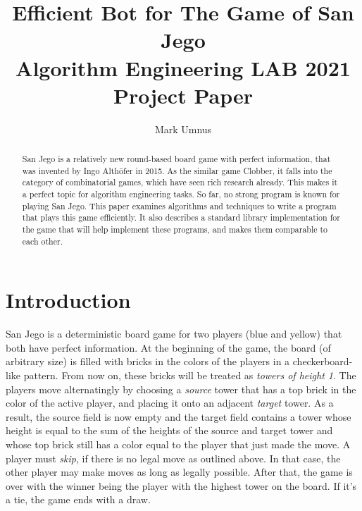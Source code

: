 \documentclass[sigconf]{acmart}
\begin{document}
\title[San Jego]{Efficient Bot for The Game of San Jego\\\large Algorithm Engineering LAB 2021 Project Paper}

\author{Mark Umnus}

\begin{abstract}

San Jego is a relatively new round-based board game with perfect information, that was invented by Ingo Althöfer in 2015.
As the similar game Clobber, it falls into the category of combinatorial games, which have seen rich research already.
This makes it a perfect topic for algorithm engineering tasks.
So far, no strong program is known for playing San Jego.
This paper examines algorithms and techniques to write a program that plays this game efficiently.
It also describes a standard library implementation for the game that will help implement these programs, and makes them comparable to each other.


\end{abstract}


\maketitle

\let\thefootnote\relax{}


\section{Introduction}

San Jego is a deterministic board game for two players (blue and yellow) that both have perfect information.
At the beginning of the game, the board (of arbitrary size) is filled with bricks in the colors of the players in a checkerboard-like pattern.
From now on, these bricks will be treated as \emph{towers of height 1}.
The players move alternatingly by choosing a \emph{source} tower that has a top brick in the color of the active player, and placing it onto an adjacent \emph{target} tower.
As a result, the source field is now empty and the target field contains a tower whose height is equal to the sum of the heights of the source and target tower and whose top brick still has a color equal to the player that just made the move.
A player must \emph{skip}, if there is no legal move as outlined above.
In that case, the other player may make moves as long as legally possible.
After that, the game is over with the winner being the player with the highest tower on the board.
If it's a tie, the game ends with a draw.
\end{document}
